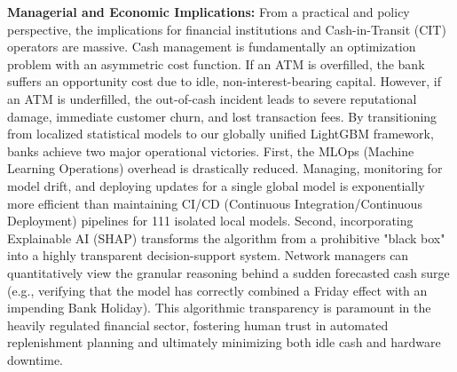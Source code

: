 \documentclass[conference, 12pt, onecolumn]{IEEEtran}
\begin{document}
\textbf{Managerial and Economic Implications:} From a practical and policy perspective, the implications for financial institutions and Cash-in-Transit (CIT) operators are massive. Cash management is fundamentally an optimization problem with an asymmetric cost function. If an ATM is overfilled, the bank suffers an opportunity cost due to idle, non-interest-bearing capital. However, if an ATM is underfilled, the out-of-cash incident leads to severe reputational damage, immediate customer churn, and lost transaction fees. By transitioning from localized statistical models to our globally unified LightGBM framework, banks achieve two major operational victories. First, the MLOps (Machine Learning Operations) overhead is drastically reduced. Managing, monitoring for model drift, and deploying updates for a single global model is exponentially more efficient than maintaining CI/CD (Continuous Integration/Continuous Deployment) pipelines for 111 isolated local models. Second, incorporating Explainable AI (SHAP) transforms the algorithm from a prohibitive "black box" into a highly transparent decision-support system. Network managers can quantitatively view the granular reasoning behind a sudden forecasted cash surge (e.g., verifying that the model has correctly combined a Friday effect with an impending Bank Holiday). This algorithmic transparency is paramount in the heavily regulated financial sector, fostering human trust in automated replenishment planning and ultimately minimizing both idle cash and hardware downtime.
\end{document}
